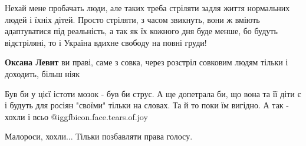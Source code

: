 
 
 
 
 

\begin{cmtfront}

Нехай мене пробачать люди, але таких треба стріляти задля життя нормальних
людей і їхніх дітей. Просто стріляти, з часом звикнуть, вони ж вміють
адаптуватися під реальність, а так як їх кожного дня буде менше, бо будуть
відстріляні, то і Україна вдихне свободу на повні груди!

\textbf{Оксана Левит} ви праві, саме з совка, через розстріл совковим людям тільки і доходить, більш ніяк


Був би у цієї істоти мозок - був би струс. А ще допетрала би, що вона та її
діти є і будуть для росіян "своїми" тільки на словах. Та й то поки їм вигідно.
А так - хохли і всьо  @igg{fbicon.face.tears.of.joy} 


Малороси, хохли... Тільки позбавляти права голосу.

\end{cmtfront}
